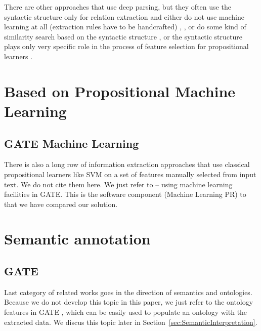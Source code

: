 There are other approaches that use deep parsing, but they often use the syntactic structure only for relation extraction and either do not use machine learning at all (extraction rules have to be handcrafted) 
\citep{Yakushiji2001},
\citep{RelEx},
\citep{Buyko:dependencyGraphs}
or do some kind of similarity search based on the syntactic structure
\citep{Etzioni08informationExtraction},
\citep{Wang:SimilarityTreeSkeletons}
or the syntactic structure plays only very specific role in the process of feature selection for propositional learners %
\citep{Bunescu:DependencyPaths}.

\section{Based on Propositional Machine Learning}
\subsection{GATE Machine Learning}
There is also a long row of information extraction approaches that use classical propositional learners like SVM on a set of features manually selected from input text. We do not cite them here. We just refer to \citep{Yaoyong09a} -- using machine learning facilities in GATE. This is the software component (Machine Learning PR) to that we have compared our solution. 

\section{Semantic annotation}
\subsection{GATE}
Last category of related works goes in the direction of semantics and ontologies. Because we do not develop this topic in this paper, we just refer to the ontology features in GATE \citep{Bon04b}, which can be easily used to populate an ontology with the extracted data. We discus this topic later in Section~\ref{sec:SemanticInterpretation}.

